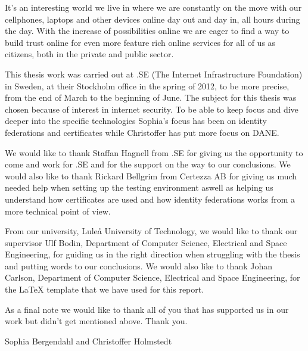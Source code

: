 It's an interesting world we live in where we are constantly on the move with our cellphones, laptops and other devices online day out and day in, all hours during the day.
With the increase of possibilities online we are eager to find a way to build trust online for even more feature rich online services for all of us as citizens, both in the private and public sector.

This thesis work was carried out at .SE (The Internet Infrastructure Foundation) in Sweden, at their Stockholm office in the spring of 2012, to be more precise, from the end of March to the beginning of June.
The subject for this thesis was chosen because of interest in internet security.
To be able to keep focus and dive deeper into the specific technologies Sophia's focus has been on identity federations and certificates while Christoffer has put more focus on DANE.

We would like to thank Staffan Hagnell from .SE for giving us the opportunity to come and work for .SE and for the support on the way to our conclusions.
We would also like to thank Rickard Bellgrim from Certezza AB for giving us much needed help when setting up the testing environment aswell as helping us understand how certificates are used and how identity federations works from a more technical point of view.

From our university, Lule\r{a} University of Technology, we would like to thank our supervisor Ulf Bodin, Department of Computer Science, Electrical and Space Engineering, for guiding us in the right direction when struggling with the thesis and putting words to our conclusions.
We would also like to thank Johan Carlson, Department of Computer Science, Electrical and Space Engineering, for the LaTeX template that we have used for this report. 

As a final note we would like to thank all of you that has supported us in our work but didn't get mentioned above.
Thank you.




%



\vspace*{2cm}%
\hfill Sophia Bergendahl and Christoffer Holmstedt
